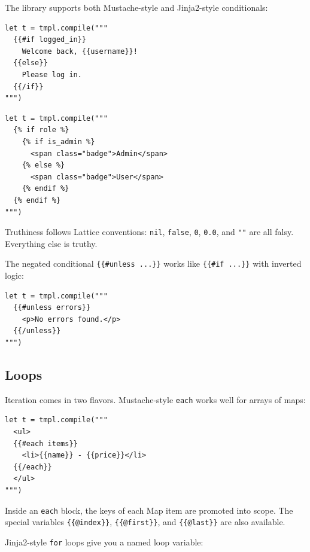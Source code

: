 
The library supports both Mustache-style and Jinja2-style conditionals:

\begin{lstlisting}[language=Lattice, caption={Mustache-style conditionals}]
let t = tmpl.compile("""
  {{#if logged_in}}
    Welcome back, {{username}}!
  {{else}}
    Please log in.
  {{/if}}
""")
\end{lstlisting}

\begin{lstlisting}[language=Lattice, caption={Jinja2-style conditionals with elif}]
let t = tmpl.compile("""
  {% if role %}
    {% if is_admin %}
      <span class="badge">Admin</span>
    {% else %}
      <span class="badge">User</span>
    {% endif %}
  {% endif %}
""")
\end{lstlisting}

Truthiness follows Lattice conventions: \lstinline|nil|, \lstinline|false|, \lstinline|0|, \lstinline|0.0|, and \lstinline|""| are all falsy.
Everything else is truthy.

The negated conditional \lstinline|{{#unless ...}}| works like \lstinline|{{#if ...}}| with inverted logic:

\begin{lstlisting}[language=Lattice, caption={Using unless}]
let t = tmpl.compile("""
  {{#unless errors}}
    <p>No errors found.</p>
  {{/unless}}
""")
\end{lstlisting}

\subsection{Loops}\label{sec:template-loops}


Iteration comes in two flavors.
Mustache-style \lstinline|each| works well for arrays of maps:

\begin{lstlisting}[language=Lattice, caption={Mustache-style each loop}]
let t = tmpl.compile("""
  <ul>
  {{#each items}}
    <li>{{name}} - {{price}}</li>
  {{/each}}
  </ul>
""")
\end{lstlisting}

Inside an \lstinline|each| block, the keys of each Map item are promoted into scope.
The special variables \lstinline|{{@index}}|, \lstinline|{{@first}}|, and \lstinline|{{@last}}| are also available.

Jinja2-style \lstinline|for| loops give you a named loop variable:

